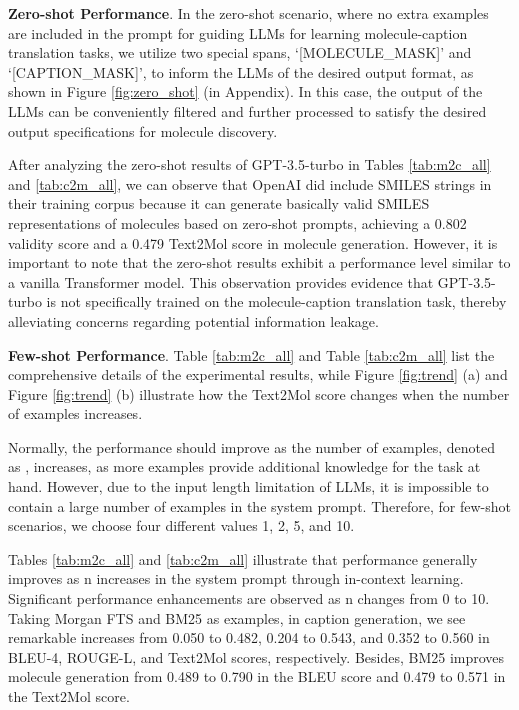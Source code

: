 \documentclass{article}
\theoremstyle{plain}
\theoremstyle{definition}
\theoremstyle{remark}
\begin{document}
\textbf{Zero-shot Performance}. 
In the zero-shot scenario, where no extra examples are included in the prompt for guiding LLMs for learning molecule-caption translation tasks, we utilize two special spans, `[MOLECULE\_MASK]' and `[CAPTION\_MASK]', to inform the LLMs of the desired output format, as shown in Figure \ref{fig:zero_shot} (in Appendix). In this case, the output of the LLMs can be conveniently filtered and further processed to satisfy the desired output specifications for molecule discovery.

After analyzing the zero-shot results of GPT-3.5-turbo in Tables \ref{tab:m2c_all} and \ref{tab:c2m_all}, we can observe that OpenAI did include SMILES strings in their training corpus because it can generate basically valid SMILES representations of molecules based on zero-shot prompts, achieving a 0.802 validity score and a 0.479 Text2Mol score in molecule generation.
However, it is important to note that the zero-shot results exhibit a performance level similar to a vanilla Transformer model. This observation provides evidence that GPT-3.5-turbo is not specifically trained on the molecule-caption translation task, thereby alleviating concerns regarding potential information leakage.




\textbf{Few-shot Performance}. 
 Table \ref{tab:m2c_all} and Table \ref{tab:c2m_all} list the comprehensive details of the experimental results, while Figure \ref{fig:trend} (a) and Figure \ref{fig:trend} (b) illustrate how the Text2Mol score changes when the number of examples increases.


Normally, the performance should improve as the number of examples, denoted as , increases, as more examples provide additional knowledge for the task at hand. 
However, due to the input length limitation of LLMs, it is impossible to contain a large number of examples in the system prompt. 
Therefore, for few-shot scenarios, we choose four different values 1, 2, 5, and 10. 

Tables \ref{tab:m2c_all} and \ref{tab:c2m_all} illustrate that performance generally improves as n increases  in the system prompt through in-context learning. Significant performance enhancements are observed as n changes from 0 to 10. 
Taking Morgan FTS and BM25 as examples, in caption generation, we see remarkable increases from 0.050 to 0.482, 0.204 to 0.543, and 0.352 to 0.560 in BLEU-4, ROUGE-L, and Text2Mol scores, respectively.
Besides, BM25 improves molecule generation from 0.489 to 0.790 in the BLEU score and 0.479 to 0.571 in the Text2Mol score.
\end{document}
